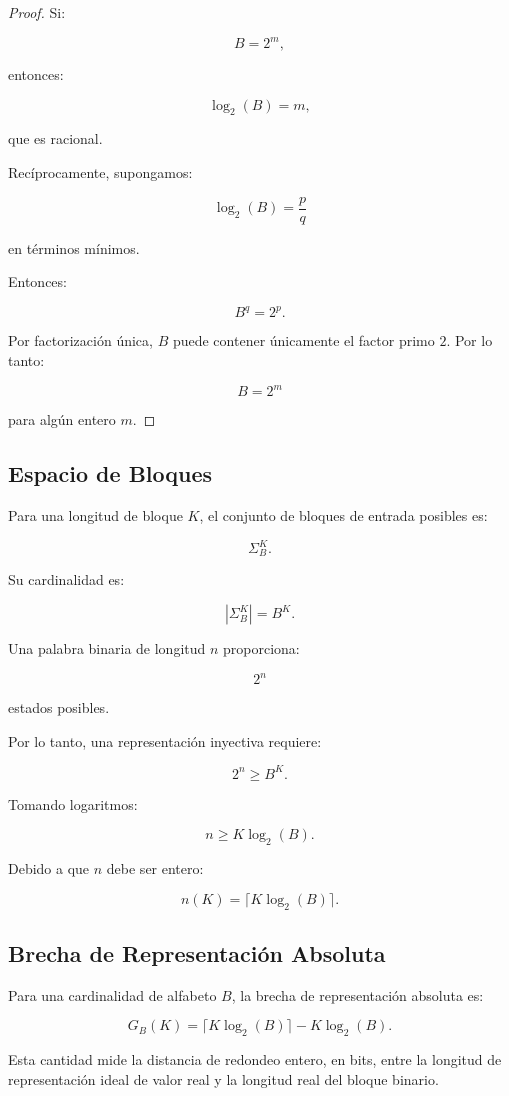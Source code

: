 \documentclass[onecolumn]{IEEEtran}
\begin{document}
\begin{proof}

Si:

\[
B=2^m,
\]

entonces:

\[
\log_2(B)=m,
\]

que es racional.

Recíprocamente, supongamos:

\[
\log_2(B)=\frac{p}{q}
\]

en términos mínimos.

Entonces:

\[
B^q=2^p .
\]

Por factorización única, $B$ puede contener únicamente el factor primo
$2$. Por lo tanto:

\[
B=2^m
\]

para algún entero $m$.

\end{proof}

\subsection{Espacio de Bloques}

Para una longitud de bloque $K$, el conjunto de bloques de entrada
posibles es:

\[
\Sigma_B^K .
\]

Su cardinalidad es:

\[
|\Sigma_B^K|=B^K .
\]

Una palabra binaria de longitud $n$ proporciona:

\[
2^n
\]

estados posibles.

Por lo tanto, una representación inyectiva requiere:

\[
2^n\geq B^K .
\]

Tomando logaritmos:

\[
n\geq K\log_2(B).
\]

Debido a que $n$ debe ser entero:

\[
n(K)=\lceil K\log_2(B)\rceil .
\]

\subsection{Brecha de Representación Absoluta}

\begin{definition}

Para una cardinalidad de alfabeto $B$, la brecha de representación
absoluta es:

\[
G_B(K)=
\lceil K\log_2(B)\rceil
-
K\log_2(B).
\]

Esta cantidad mide la distancia de redondeo entero, en bits, entre
la longitud de representación ideal de valor real y la longitud real
del bloque binario.

\end{definition}
\end{document}
